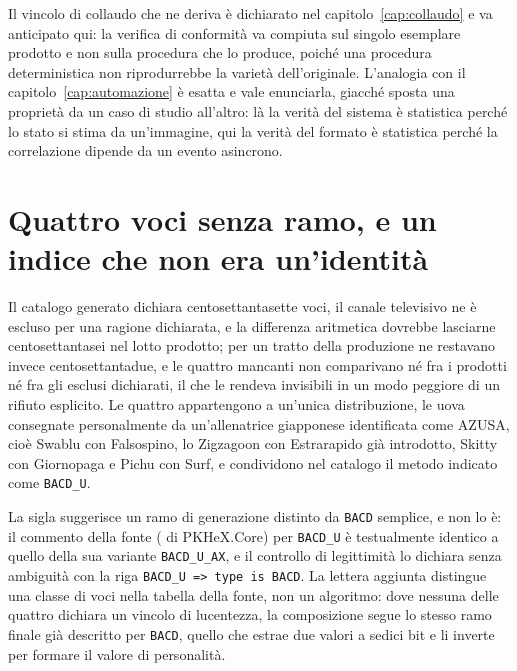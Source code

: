 Il vincolo di collaudo che ne deriva è dichiarato nel capitolo~\ref{cap:collaudo} e va anticipato qui: la verifica di conformità va compiuta sul singolo esemplare prodotto e non sulla procedura che lo produce, poiché una procedura deterministica non riprodurrebbe la varietà dell'originale. L'analogia con il capitolo~\ref{cap:automazione} è esatta e vale enunciarla, giacché sposta una proprietà da un caso di studio all'altro: là la verità del sistema è statistica perché lo stato si stima da un'immagine, qui la verità del formato è statistica perché la correlazione dipende da un evento asincrono.

\section{Quattro voci senza ramo, e un indice che non era un'identità}

Il catalogo generato dichiara centosettantasette voci, il canale televisivo ne è escluso per una ragione dichiarata, e la differenza aritmetica dovrebbe lasciarne centosettantasei nel lotto prodotto; per un tratto della produzione ne restavano invece centosettantadue, e le quattro mancanti non comparivano né fra i prodotti né fra gli esclusi dichiarati, il che le rendeva invisibili in un modo peggiore di un rifiuto esplicito. Le quattro appartengono a un'unica distribuzione, le uova consegnate personalmente da un'allenatrice giapponese identificata come AZUSA, cioè Swablu con Falsospino, lo Zigzagoon con Estrarapido già introdotto, Skitty con Giornopaga e Pichu con Surf, e condividono nel catalogo il metodo indicato come \texttt{BACD\_U}.

La sigla suggerisce un ramo di generazione distinto da \texttt{BACD} semplice, e non lo è: il commento della fonte ( di PKHeX.Core) per \texttt{BACD\_U} è testualmente identico a quello della sua variante \texttt{BACD\_U\_AX}, e il controllo di legittimità lo dichiara senza ambiguità con la riga \texttt{BACD\_U => type is BACD}. La lettera aggiunta distingue una classe di voci nella tabella della fonte, non un algoritmo: dove nessuna delle quattro dichiara un vincolo di lucentezza, la composizione segue lo stesso ramo finale già descritto per \texttt{BACD}, quello che estrae due valori a sedici bit e li inverte per formare il valore di personalità.

